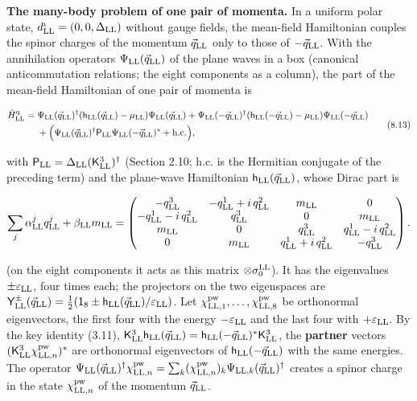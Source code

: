 \documentclass[
  10pt,
]{article}
\begin{document}
\textbf{The many-body problem of one pair of momenta.} In a uniform
polar state, \(d^\iota_{\rm LL}=(0,0,\Delta_{\rm LL})\) without gauge
fields, the mean-field Hamiltonian couples the spinor charges of the
momentum \(\vec q_{\rm LL}\) only to those of \(-\vec q_{\rm LL}\). With
the annihilation operators \(\Psi_{\rm LL}(\vec q_{\rm LL})\) of the
plane waves in a box (canonical anticommutation relations; the eight
components as a column), the part of the mean-field Hamiltonian of one
pair of momenta is

\[\begin{aligned}\hat H^{\rm q}_{\rm LL}={}&\Psi_{\rm LL}(\vec q_{\rm LL})^\dagger(\mathsf h_{\rm LL}(\vec q_{\rm LL})-\mu_{\rm LL})\Psi_{\rm LL}(\vec q_{\rm LL})+\Psi_{\rm LL}(-\vec q_{\rm LL})^\dagger(\mathsf h_{\rm LL}(-\vec q_{\rm LL})-\mu_{\rm LL})\Psi_{\rm LL}(-\vec q_{\rm LL})\\&+\Big(\Psi_{\rm LL}(\vec q_{\rm LL})^\dagger\mathsf P_{\rm LL}\Psi_{\rm LL}(-\vec q_{\rm LL})^*+\text{h.c.}\Big),\end{aligned}\tag{8.13}\]

with
\(\mathsf P_{\rm LL}=\Delta_{\rm LL}(\mathsf K^3_{\rm LL})^\dagger\)
(Section 2.10; h.c. is the Hermitian conjugate of the preceding term)
and the plane-wave Hamiltonian \(\mathsf h_{\rm LL}(\vec q_{\rm LL})\),
whose Dirac part is

\[\sum_j\alpha^j_{\rm LL}q^j_{\rm LL}+\beta_{\rm LL}m_{\rm LL}=\begin{pmatrix}-q^3_{\rm LL}&-q^1_{\rm LL}+i\,q^2_{\rm LL}&m_{\rm LL}&0\\-q^1_{\rm LL}-i\,q^2_{\rm LL}&q^3_{\rm LL}&0&m_{\rm LL}\\m_{\rm LL}&0&q^3_{\rm LL}&q^1_{\rm LL}-i\,q^2_{\rm LL}\\0&m_{\rm LL}&q^1_{\rm LL}+i\,q^2_{\rm LL}&-q^3_{\rm LL}\end{pmatrix}.\]

(on the eight components it acts as this matrix
\(\otimes\sigma^{\rm LL}_0\)). It has the eigenvalues
\(\pm\varepsilon_{\rm LL}\), four times each; the projectors on the two
eigenspaces are
\(\mathsf Y^\pm_{\rm LL}(\vec q_{\rm LL})=\tfrac12(\mathsf 1_8\pm\mathsf h_{\rm LL}(\vec q_{\rm LL})/\varepsilon_{\rm LL})\).
Let \(\chi^{\rm pw}_{{\rm LL},1},\dots,\chi^{\rm pw}_{{\rm LL},8}\) be
orthonormal eigenvectors, the first four with the energy
\(-\varepsilon_{\rm LL}\) and the last four with
\(+\varepsilon_{\rm LL}\). By the key identity (3.11),
\(\mathsf K^3_{\rm LL}\mathsf h_{\rm LL}(\vec q_{\rm LL})=\mathsf h_{\rm LL}(-\vec q_{\rm LL})^*\mathsf K^3_{\rm LL}\),
the \textbf{partner} vectors
\((\mathsf K^3_{\rm LL}\chi^{\rm pw}_{{\rm LL},n})^*\) are orthonormal
eigenvectors of \(\mathsf h_{\rm LL}(-\vec q_{\rm LL})\) with the same
energies. The operator
\(\Psi_{\rm LL}(\vec q_{\rm LL})^\dagger\chi^{\rm pw}_{{\rm LL},n}=\sum_k(\chi^{\rm pw}_{{\rm LL},n})_k\Psi_{{\rm LL},k}(\vec q_{\rm LL})^\dagger\)
creates a spinor charge in the state \(\chi^{\rm pw}_{{\rm LL},n}\) of
the momentum \(\vec q_{\rm LL}\).
\end{document}

